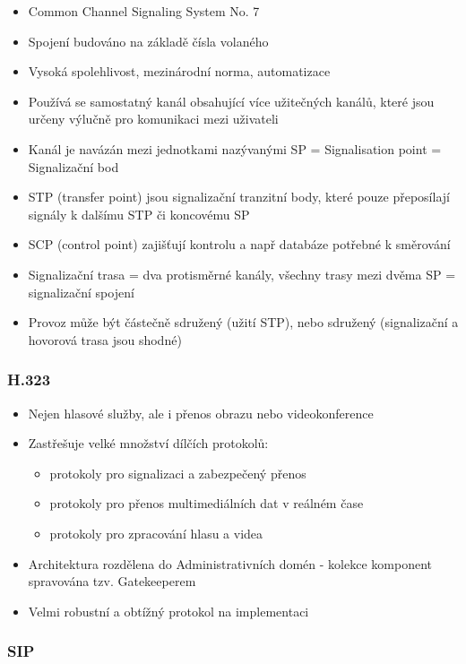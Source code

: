 \documentclass[10pt,a4paper]{article}
\begin{document}
\begin{itemize}
\item Common Channel Signaling System No. 7
\item Spojení budováno na základě čísla volaného
\item Vysoká spolehlivost, mezinárodní norma, automatizace
\item Používá se samostatný kanál obsahující více užitečných kanálů, které jsou určeny výlučně pro komunikaci mezi uživateli
\item Kanál je navázán mezi jednotkami nazývanými SP = Signalisation point = Signalizační bod
\item STP (transfer point) jsou signalizační tranzitní body, které pouze přeposílají signály k dalšímu STP či koncovému SP
\item SCP (control point) zajišťují kontrolu a např databáze potřebné k směrování
\item Signalizační trasa = dva protisměrné kanály, všechny trasy mezi dvěma SP = signalizační spojení
\item Provoz může být částečně sdružený (užití STP), nebo sdružený (signalizační a hovorová trasa jsou shodné)
\end{itemize}
\subsubsection{H.323}

\begin{itemize}
\item Nejen hlasové služby, ale i přenos obrazu nebo videokonference
\item Zastřešuje velké množství dílčích protokolů:
\begin{itemize}
\item protokoly pro signalizaci a zabezpečený přenos
\item protokoly pro přenos multimediálních dat v reálném čase
\item protokoly pro zpracování hlasu a videa
\end{itemize}
\item Architektura rozdělena do Administrativních domén - kolekce komponent spravována tzv. Gatekeeperem
\item Velmi robustní a obtížný protokol na implementaci
\end{itemize}
\subsubsection{SIP}
\end{document}
